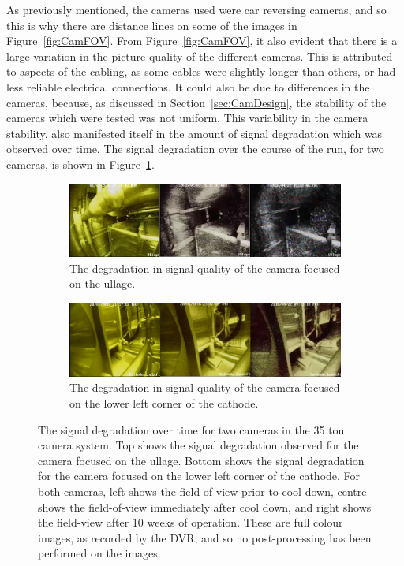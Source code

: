 As previously mentioned, the cameras used were car reversing cameras, and so this is why there are distance lines on some of the images in Figure~\ref{fig:CamFOV}. From Figure~\ref{fig:CamFOV}, it also evident that there is a large variation in the picture quality of the different cameras. This is attributed to aspects of the cabling, as some cables were slightly longer than others, or had less reliable electrical connections. It could also be due to differences in the cameras, because, as discussed in Section~\ref{sec:CamDesign}, the stability of the cameras which were tested was not uniform. This variability in the camera stability, also manifested itself in the amount of signal degradation which was observed over time. The signal degradation over the course of the run, for two cameras, is shown in Figure~\ref{fig:CamSigDeg}. \\

\begin{figure}[h!]
  \centering
  \begin{subfigure}{0.95\textwidth}
    \centering
    \includegraphics[width=\textwidth]{Cam1degradation2}
    \caption{The degradation in signal quality of the camera focused on the ullage.}
  \end{subfigure}
  \begin{subfigure}{0.95\textwidth}
    \centering
    \includegraphics[width=\textwidth]{Cam4degradation2}
    \caption{The degradation in signal quality of the camera focused on the lower left corner of the cathode.}
  \end{subfigure}
  \caption[The signal degradation over time for two cameras in the 35 ton camera system]
          {The signal degradation over time for two cameras in the 35 ton camera system. Top shows the signal degradation observed for the camera focused on the ullage. Bottom shows the signal degradation for the camera focused on the lower left corner of the cathode. For both cameras, left shows the field-of-view prior to cool down, centre shows the field-of-view immediately after cool down, and right shows the field-view after 10 weeks of operation. These are full colour images, as recorded by the DVR, and so no post-processing has been performed on the images.}  
  \label{fig:CamSigDeg}
\end{figure}

